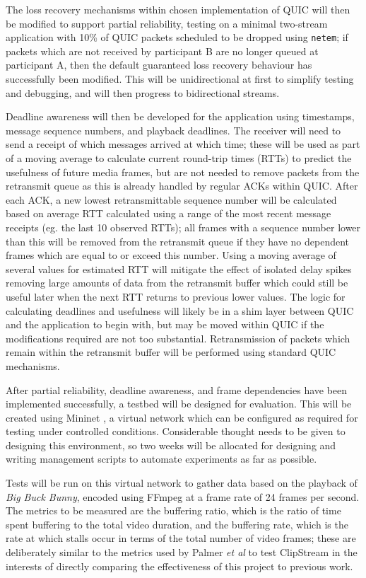 \documentclass{mprop}
\begin{document}
The loss recovery mechanisms within chosen implementation of QUIC will then be modified to support partial reliability, testing on a minimal two-stream application with 10\% of QUIC packets scheduled to be dropped using \texttt{netem}; if packets which are not received by participant B are no longer queued at participant A, then the default guaranteed loss recovery behaviour has successfully been modified. This will be unidirectional at first to simplify testing and debugging, and will then progress to bidirectional streams.

Deadline awareness will then be developed for the application using timestamps, message sequence numbers, and playback deadlines. The receiver will need to send a receipt of which messages arrived at which time; these will be used as part of a moving average to calculate current round-trip times (RTTs) to predict the usefulness of future media frames, but are not needed to remove packets from the retransmit queue as this is already handled by regular ACKs within QUIC. After each ACK, a new lowest retransmittable sequence number will be calculated based on average RTT calculated using a range of the most recent message receipts (eg. the last 10 observed RTTs); all frames with a sequence number lower than this will be removed from the retransmit queue if they have no dependent frames which are equal to or exceed this number. Using a moving average of several values for estimated RTT will mitigate the effect of isolated delay spikes removing large amounts of data from the retransmit buffer which could still be useful later when the next RTT returns to previous lower values. The logic for calculating deadlines and usefulness will likely be in a shim layer between QUIC and the application to begin with, but may be moved within QUIC if the modifications required are not too substantial. Retransmission of packets which remain within the retransmit buffer will be performed using standard QUIC mechanisms.

After partial reliability, deadline awareness, and frame dependencies have been implemented successfully, a testbed will be designed for evaluation. This will be created using Mininet \cite{mininet}, a virtual network which can be configured as required for testing under controlled conditions. Considerable thought needs to be given to designing this environment, so two weeks will be allocated for designing and writing management scripts to automate experiments as far as possible.

Tests will be run on this virtual network to gather data based on the playback of \textit{Big Buck Bunny}, encoded using FFmpeg \cite{ffmpeg} at a frame rate of 24 frames per second. The metrics to be measured are the buffering ratio, which is the ratio of time spent buffering to the total video duration, and the buffering rate, which is the rate at which stalls occur in terms of the total number of video frames; these are deliberately similar to the metrics used by Palmer \textit{et al} to test ClipStream \cite{Palmer2018} in the interests of directly comparing the effectiveness of this project to previous work.
\end{document}
